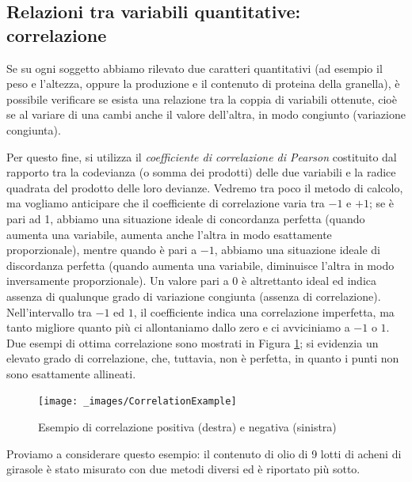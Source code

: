 \documentclass[a4paper,12pt,oneside]{book}
\begin{document}
\hypertarget{relazioni-tra-variabili-quantitative-correlazione}{%
\subsection{Relazioni tra variabili quantitative: correlazione}\label{relazioni-tra-variabili-quantitative-correlazione}}

Se su ogni soggetto abbiamo rilevato due caratteri quantitativi (ad esempio il peso e l'altezza, oppure la produzione e il contenuto di proteina della granella), è possibile verificare se esista una relazione tra la coppia di variabili ottenute, cioè se al variare di una cambi anche il valore dell'altra, in modo congiunto (variazione congiunta).

Per questo fine, si utilizza il \emph{coefficiente di correlazione di Pearson} costituito dal rapporto tra la codevianza (o somma dei prodotti) delle due variabili e la radice quadrata del prodotto delle loro devianze. Vedremo tra poco il metodo di calcolo, ma vogliamo anticipare che il coefficiente di correlazione varia tra \(-1\) e \(+1\); se è pari ad 1, abbiamo una situazione ideale di concordanza perfetta (quando aumenta una variabile, aumenta anche l'altra in modo esattamente proporzionale), mentre quando è pari a \(-1\), abbiamo una situazione ideale di discordanza perfetta (quando aumenta una variabile, diminuisce l'altra in modo inversamente proporzionale). Un valore pari a \(0\) è altrettanto ideal ed indica assenza di qualunque grado di variazione congiunta (assenza di correlazione). Nell'intervallo tra \(-1\) ed \(1\), il coefficiente indica una correlazione imperfetta, ma tanto migliore quanto più ci allontaniamo dallo zero e ci avviciniamo a \(-1\) o \(1\). Due esempi di ottima correlazione sono mostrati in Figura \ref{fig:figName311}; si evidenzia un elevato grado di correlazione, che, tuttavia, non è perfetta, in quanto i punti non sono esattamente allineati.

\begin{figure}

{\centering \texttt{[image: \_images/CorrelationExample]} 

}

\caption{Esempio di correlazione positiva (destra) e negativa (sinistra)}\label{fig:figName311}
\end{figure}

Proviamo a considerare questo esempio: il contenuto di olio di 9 lotti di acheni di girasole è stato misurato con due metodi diversi ed è riportato più sotto.
\end{document}
